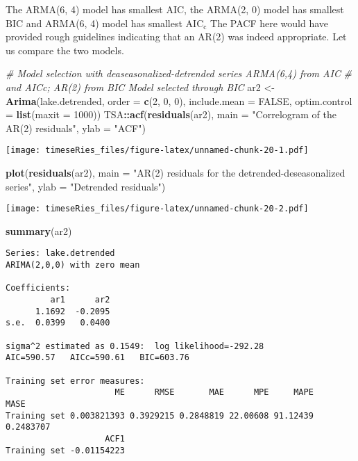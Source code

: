 \documentclass[]{book}
\newenvironment{Shaded}{\begin{snugshade}}{\end{snugshade}}
\newcommand{\KeywordTok}[1]{\textcolor[rgb]{0.13,0.29,0.53}{\textbf{#1}}}
\newcommand{\DataTypeTok}[1]{\textcolor[rgb]{0.13,0.29,0.53}{#1}}
\newcommand{\DecValTok}[1]{\textcolor[rgb]{0.00,0.00,0.81}{#1}}
\newcommand{\StringTok}[1]{\textcolor[rgb]{0.31,0.60,0.02}{#1}}
\newcommand{\CommentTok}[1]{\textcolor[rgb]{0.56,0.35,0.01}{\textit{#1}}}
\newcommand{\OtherTok}[1]{\textcolor[rgb]{0.56,0.35,0.01}{#1}}
\newcommand{\OperatorTok}[1]{\textcolor[rgb]{0.81,0.36,0.00}{\textbf{#1}}}
\newcommand{\NormalTok}[1]{#1}
\begin{document}
The ARMA(6, 4) model has smallest \(\mathrm{AIC}\), the ARMA(2, 0) model
has smallest \(\mathrm{BIC}\) and ARMA(6, 4) model has smallest
\(\mathrm{AIC}_{\mathrm{c}}\) The PACF here would have provided rough
guidelines indicating that an AR(2) was indeed appropriate. Let us
compare the two models.

\begin{Shaded}
\begin{Highlighting}[]
\CommentTok{# Model selection with deaseasonalized-detrended series ARMA(6,4) from AIC}
\CommentTok{# and AICc; AR(2) from BIC Model selected through BIC}
\NormalTok{ar2 <-}\StringTok{ }\KeywordTok{Arima}\NormalTok{(lake.detrended, }\DataTypeTok{order =} \KeywordTok{c}\NormalTok{(}\DecValTok{2}\NormalTok{, }\DecValTok{0}\NormalTok{, }\DecValTok{0}\NormalTok{), }\DataTypeTok{include.mean =} \OtherTok{FALSE}\NormalTok{, }\DataTypeTok{optim.control =} \KeywordTok{list}\NormalTok{(}\DataTypeTok{maxit =} \DecValTok{1000}\NormalTok{))}
\NormalTok{TSA}\OperatorTok{::}\KeywordTok{acf}\NormalTok{(}\KeywordTok{residuals}\NormalTok{(ar2), }\DataTypeTok{main =} \StringTok{"Correlogram of the AR(2) residuals"}\NormalTok{, }\DataTypeTok{ylab =} \StringTok{"ACF"}\NormalTok{)}
\end{Highlighting}
\end{Shaded}

\texttt{[image: timeseRies\_files/figure-latex/unnamed-chunk-20-1.pdf]}

\begin{Shaded}
\begin{Highlighting}[]
\KeywordTok{plot}\NormalTok{(}\KeywordTok{residuals}\NormalTok{(ar2), }\DataTypeTok{main =} \StringTok{"AR(2) residuals for the detrended-deseasonalized series"}\NormalTok{, }
    \DataTypeTok{ylab =} \StringTok{"Detrended residuals"}\NormalTok{)}
\end{Highlighting}
\end{Shaded}

\texttt{[image: timeseRies\_files/figure-latex/unnamed-chunk-20-2.pdf]}

\begin{Shaded}
\begin{Highlighting}[]
\KeywordTok{summary}\NormalTok{(ar2)}
\end{Highlighting}
\end{Shaded}

\begin{verbatim}
Series: lake.detrended 
ARIMA(2,0,0) with zero mean 

Coefficients:
         ar1      ar2
      1.1692  -0.2095
s.e.  0.0399   0.0400

sigma^2 estimated as 0.1549:  log likelihood=-292.28
AIC=590.57   AICc=590.61   BIC=603.76

Training set error measures:
                      ME      RMSE       MAE      MPE     MAPE      MASE
Training set 0.003821393 0.3929215 0.2848819 22.00608 91.12439 0.2483707
                    ACF1
Training set -0.01154223
\end{verbatim}
\end{document}
